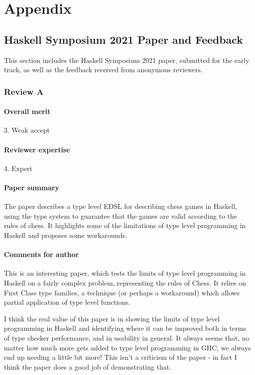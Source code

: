 \chapter{Appendix}

\section{Haskell Symposium 2021 Paper and Feedback} \label{symposiumfeedback}

This section includes the Haskell Symposium 2021 paper, submitted for the early track, as well as the feedback received from anonymous reviewers.

\subsection{Review A}

\subsubsection{Overall merit}

3. Weak accept

\subsubsection{Reviewer expertise}

4. Expert

\subsubsection{Paper summary}

The paper describes a type level EDSL for describing chess games in Haskell, using the type system to guarantee that the games are valid according to the rules of chess. It highlights some of the limitations of type level programming in Haskell and proposes some workarounds.

\subsubsection{Comments for author}

This is an interesting paper, which tests the limits of type level programming in Haskell on a fairly complex problem, representing the rules of Chess. It relies on First Class type families, a technique (or perhaps a workaround) which allows partial application of type level functions.

I think the real value of this paper is in showing the limits of type level programming in Haskell and identifying where it can be improved both in terms of type checker performance, and in usability in general. It always seems that, no matter how much more gets added to type level programming in GHC, we always end up needing a little bit more! This isn't a criticism of the paper - in fact I think the paper does a good job of demonstrating that.

